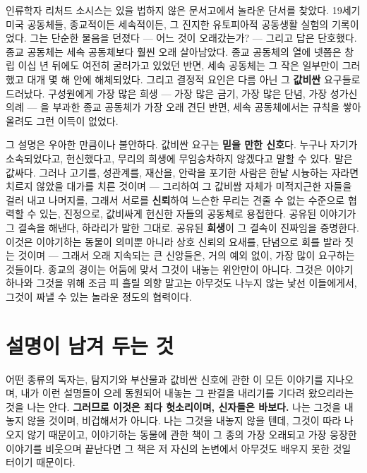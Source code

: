 인류학자 리처드 소시스는 있을 법하지 않은 문서고에서 놀라운 단서를 찾았다. 19세기 미국 공동체들, 종교적이든 세속적이든, 그 진지한 유토피아적 공동생활 실험의 기록이었다. 그는 단순한 물음을 던졌다 — 어느 것이 오래갔는가? — 그리고 답은 단호했다. 종교 공동체는 세속 공동체보다 훨씬 오래 살아남았다. 종교 공동체의 열에 넷쯤은 창립 이십 년 뒤에도 여전히 굴러가고 있었던 반면, 세속 공동체는 그 작은 일부만이 그러했고 대개 몇 해 안에 해체되었다. 그리고 결정적 요인은 다름 아닌 그 \textbf{값비싼} 요구들로 드러났다. 구성원에게 가장 많은 희생 — 가장 많은 금기, 가장 많은 단념, 가장 성가신 의례 — 을 부과한 종교 공동체가 가장 오래 견딘 반면, 세속 공동체에서는 규칙을 쌓아 올려도 그런 이득이 없었다.

그 설명은 우아한 만큼이나 불안하다. 값비싼 요구는 \textbf{믿을 만한 신호}다. 누구나 자기가 소속되었다고, 헌신했다고, 무리의 희생에 무임승차하지 않겠다고 말할 수 있다. 말은 값싸다. 그러나 고기를, 성관계를, 재산을, 안락을 포기한 사람은 한낱 시늉하는 자라면 치르지 않았을 대가를 치른 것이며 — 그리하여 그 값비쌈 자체가 미적지근한 자들을 걸러 내고 나머지를, 그래서 서로를 \textbf{신뢰}하여 느슨한 무리는 견줄 수 없는 수준으로 협력할 수 있는, 진정으로, 값비싸게 헌신한 자들의 공동체로 용접한다. 공유된 이야기가 그 결속을 해낸다, 하라리가 말한 그대로. 공유된 \textbf{희생}이 그 결속이 진짜임을 증명한다. 이것은 이야기하는 동물이 의미뿐 아니라 상호 신뢰의 요새를, 단념으로 회를 발라 짓는 것이며 — 그래서 오래 지속되는 큰 신앙들은, 거의 예외 없이, 가장 많이 요구하는 것들이다. 종교의 경이는 어둠에 맞서 그것이 내놓는 위안만이 아니다. 그것은 이야기 하나와 그것을 위해 조금 피 흘릴 의향 말고는 아무것도 나누지 않는 낯선 이들에게서, 그것이 짜낼 수 있는 놀라운 정도의 협력이다.

\section*{설명이 남겨 두는 것}

어떤 종류의 독자는, 탐지기와 부산물과 값비싼 신호에 관한 이 모든 이야기를 지나오며, 내가 이런 설명들이 으레 동원되어 내놓는 그 판결을 내리기를 기다려 왔으리라는 것을 나는 안다. \textbf{그러므로 이것은 죄다 헛소리이며, 신자들은 바보다.} 나는 그것을 내놓지 않을 것이며, 비겁해서가 아니다. 나는 그것을 내놓지 않을 텐데, 그것이 따라 나오지 않기 때문이고, 이야기하는 동물에 관한 책이 그 종의 가장 오래되고 가장 웅장한 이야기를 비웃으며 끝난다면 그 책은 저 자신의 논변에서 아무것도 배우지 못한 것일 터이기 때문이다.

